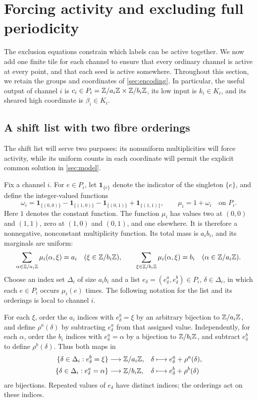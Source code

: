 \section{Forcing activity and excluding full periodicity}
\label{sec:activation}

The exclusion equations constrain which labels can be active together.
We now add one finite tile for each channel to ensure that every ordinary
channel is active at every point, and that each seed is active somewhere.
Throughout this section, we retain the groups and coordinates of
\cref{sec:encoding}.  In particular, the useful output of channel $i$ is
$c_i\in P_i=\mathbb Z/a_i\mathbb Z\times\mathbb Z/b_i\mathbb Z$, its low input is $k_i\in K_i$,
and its sheared high coordinate is $\beta_i\in K_i$.

\subsection{A shift list with two fibre orderings}

The shift list will serve two purposes: its nonuniform multiplicities
will force activity, while its uniform counts in each coordinate will
permit the explicit common solution in \cref{sec:model}.

Fix a channel $i$.  For $e\in P_i$, let $\mathbf 1_{\{e\}}$ denote the
indicator of the singleton $\{e\}$, and define the integer-valued functions
\[
 \omega_i
 =\mathbf 1_{\{(0,0)\}}-\mathbf 1_{\{(1,0)\}}
  -\mathbf 1_{\{(0,1)\}}+\mathbf 1_{\{(1,1)\}},
 \qquad
 \mu_i=1+\omega_i
 \quad\text{on }P_i.
\]
Here $1$ denotes the constant function.  The function $\mu_i$ has values
two at $(0,0)$ and $(1,1)$, zero at $(1,0)$ and $(0,1)$, and one elsewhere.
It is therefore a nonnegative, nonconstant multiplicity function.
Its total mass is $a_i b_i$, and its marginals are uniform:
\[
 \sum_{\alpha\in\mathbb Z/a_i\mathbb Z}\mu_i(\alpha,\xi)=a_i
 \quad(\xi\in\mathbb Z/b_i\mathbb Z),
 \qquad
 \sum_{\xi\in\mathbb Z/b_i\mathbb Z}\mu_i(\alpha,\xi)=b_i
 \quad(\alpha\in\mathbb Z/a_i\mathbb Z).
\]
Choose an index set $\Delta_i$ of size $a_i b_i$ and a list
$e_\delta=(e_\delta^a,e_\delta^b)\in P_i$, $\delta\in\Delta_i$, in
which each $e\in P_i$ occurs $\mu_i(e)$ times.  The following notation
for the list and its orderings is local to channel $i$.

For each $\xi$, order the $a_i$ indices with $e_\delta^b=\xi$ by an
arbitrary bijection to $\mathbb Z/a_i\mathbb Z$, and define $\rho^a(\delta)$ by
subtracting $e_\delta^a$ from that assigned value.  Independently, for
each $\alpha$, order the $b_i$ indices with $e_\delta^a=\alpha$ by a
bijection to $\mathbb Z/b_i\mathbb Z$, and subtract $e_\delta^b$ to define
$\rho^b(\delta)$.  Thus both maps in
\begin{equation}
\label{act:fibre-orderings}
\begin{aligned}
 \{\delta\in\Delta_i:e_\delta^b=\xi\}
   &\longrightarrow\mathbb Z/a_i\mathbb Z,
 &\delta&\longmapsto e_\delta^a+\rho^a(\delta),\\
 \{\delta\in\Delta_i:e_\delta^a=\alpha\}
   &\longrightarrow\mathbb Z/b_i\mathbb Z,
 &\delta&\longmapsto e_\delta^b+\rho^b(\delta)
\end{aligned}
\end{equation}
are bijections.  Repeated values of $e_\delta$ have distinct indices;
the orderings act on these indices.

